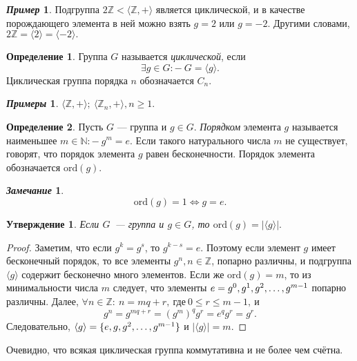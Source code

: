 \documentclass[a4paper, 14pt]{extarticle}
\newcommand{\integers}{\mathbb{Z}}
\newcommand{\naturals}{\mathbb{N}}
\newcommand{\ord}{\mathrm{ord}}
\newcommand{\suchthat}{{:}{-} \ }
\theoremstyle{definition}
\newtheorem*{exmpl*}{\textit{Пример}}
\newtheorem*{exmpls}{\textit{Примеры}}
\newtheorem*{remark}{\textit{Замечание}}
\newtheorem{definition}{Определение}
\theoremstyle{plain}
\numberwithin{theorem}{section}
\numberwithin{definition}{section}
\newtheorem*{statement*}{Утверждение}
\numberwithin{statement}{section}
\numberwithin{lemma}{section}
\numberwithin{consequence}{section}
\begin{document}
		\begin{exmpl*}
			Подгруппа ${2\integers < \langle \integers, + \rangle}$ является циклической, и в качестве порождающего элемента в ней можно взять $g = 2$ или $g = -2.$ Другими словами, ${2\integers = \langle 2 \rangle = \langle -2 \rangle.}$
		\end{exmpl*}
		\begin{definition}
			Группа $G$ называется \textit{циклической}, если 
			\begin{equation*}
				\exists g \in G \suchthat G = \langle g \rangle.
			\end{equation*}
			Циклическая группа порядка $n$ обозначается ${C_n.}$
		\end{definition}
		\begin{exmpls}
			${\langle \integers, + \rangle; \ \langle \integers_n, + \rangle, n \geqslant 1.}$
		\end{exmpls}
		\begin{definition}
			Пусть $G$ — группа и ${g \in G}$. \textit{Порядком} элемента $g$ называется наименьшее ${m \in \naturals \suchthat g^m = e}$. Если такого натурального числа $m$ не существует, говорят, что порядок элемента $g$ равен бесконечности. Порядок элемента обозначается $\ord(g)$.
		\end{definition}
		\begin{remark}
			\begin{equation*}
				\ord(g) = 1 \Longleftrightarrow g = e.
			\end{equation*}
			
		\end{remark}
		\begin{statement*}
			Если $G$~--- группа и $g \in G$, то $\ord(g) = |\langle g \rangle|.$
		\end{statement*}
		\begin{proof}
			Заметим, что если $g^k = g^s$, то $g^{k - s} = e$. Поэтому если элемент $g$ имеет бесконечный порядок, то все элементы $g^n, n \in \integers$, попарно различны, и подгруппа $\langle g \rangle$ содержит бесконечно много элементов. 
			Если же ${\ord(g) = m}$, то из минимальности числа $m$ следует, что элементы ${e = g^0, g^1, g^2, \mathellipsis , g^{m-1}}$ попарно различны.
			Далее, ${\forall n \in \integers{:} \ n = mq + r, \ \text{где} \ 0 \leqslant r \leq m - 1, \ \text{и}}$
			\begin{equation*}
				g^n = g^{mq + r} = (g^m)^q g^r = e^q g^r = g^r.
			\end{equation*}
			Следовательно, $\langle g \rangle = \{e, g, g^2, \mathellipsis, g^{m - 1}\}$ и $|\langle g \rangle| = m.$
		\end{proof}
		Очевидно, что всякая циклическая группа коммутативна и не более чем счётна.
	\newpage
\end{document}
